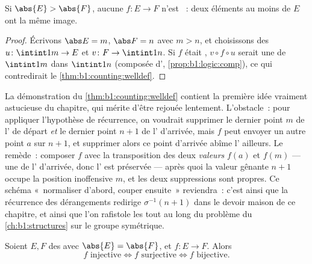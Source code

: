 \begin{corollary}\label{cor:b1:counting:pigeonhole}
Si $\abs{E} > \abs{F}$, aucune  $f \colon E \to F$ n'est
~: deux éléments au moins de $E$ ont la même image.
\end{corollary}

\begin{proof}
Écrivons $\abs E = m$, $\abs F = n$ avec $m > n$, et choisissons des
 $u \colon \intint1m \to E$ et $v \colon F \to \intint1n$. Si $f$
était , $v \circ f \circ u$ serait une  de
$\intint1m$ dans $\intint1n$ (composée d',
\cref{prop:b1:logic:comp}), ce qui contredirait
le \cref{thm:b1:counting:welldef}.
\end{proof}

\begin{remark}\label{rem:b1:counting:swapinterlude}
La démonstration du \cref{thm:b1:counting:welldef} contient la
première idée vraiment astucieuse du chapitre, qui mérite d'être
rejouée lentement. L'obstacle~: pour appliquer l'hypothèse de
récurrence, on voudrait supprimer le dernier point $m$ de
l' de départ \emph{et} le dernier point $n+1$ de
l' d'arrivée, mais $f$ peut envoyer un autre point $a$ sur
$n + 1$, et supprimer alors ce point d'arrivée abîme l'
ailleurs. Le remède~: composer $f$ avec la transposition des deux
\emph{valeurs} $f(a)$ et $f(m)$ --- une  de l'
d'arrivée, donc l' est préservée --- après quoi la
valeur gênante $n + 1$ occupe la position inoffensive $m$, et
les deux suppressions sont propres. Ce schéma «~normaliser
d'abord, couper ensuite~» reviendra~: c'est ainsi que la
récurrence des dérangements redirige $\sigma^{-1}(n+1)$ dans le
devoir maison de ce chapitre, et ainsi que l'on rafistole les
 tout au long du problème du \cref{ch:b1:structures}
sur le groupe symétrique.
\end{remark}

\begin{proposition}\label{prop:b1:counting:injsur}
Soient $E, F$ des  avec $\abs{E} = \abs{F}$, et $f \colon E
\to F$. Alors
\[
f \text{ injective} \iff f \text{ surjective} \iff f \text{ bijective}.
\]
\end{proposition}

